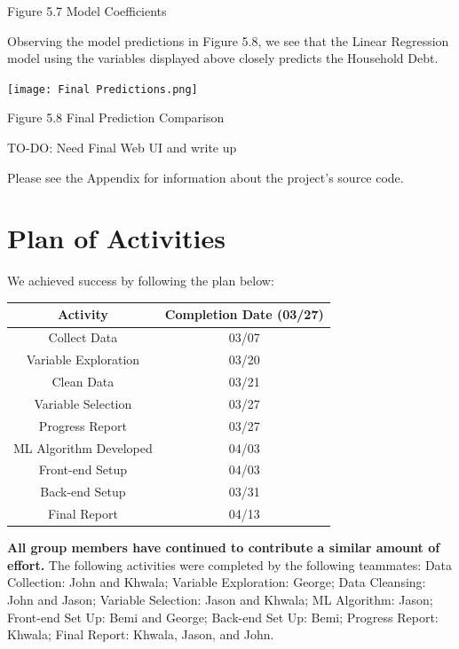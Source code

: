 \documentclass[sigconf,nonacm,11pt]{acmart}
\begin{document}
\begin{center} Figure 5.7 Model Coefficients \end{center}


Observing the model predictions in Figure 5.8, we see that the Linear Regression model using the variables displayed above closely predicts the Household Debt.

\texttt{[image: Final Predictions.png]}
\begin{center}Figure 5.8 Final Prediction Comparison \end{center}

TO-DO: Need Final Web UI and write up

Please see the Appendix for information about the project's source code.

\section{Plan of Activities}

We achieved success by following the plan below:\vspace{0.07em}
\begin{center}
    \begin{tabular}{||c|c||}
    \hline
    Activity & Completion Date (03/27)\\
    \hline\hline
    Collect Data & 03/07\\
    Variable Exploration & 03/20\\
    Clean Data & 03/21\\
    Variable Selection & 03/27\\
    Progress Report & 03/27\\
    ML Algorithm Developed & 04/03\\
    Front-end Setup & 04/03\\
    Back-end Setup & 03/31\\
    Final Report & 04/13\\
    \hline
    \end{tabular}
\end{center}

\textbf{All group members have continued to contribute a similar amount of effort.} The following activities were completed by the following teammates: Data Collection: John and Khwala; Variable Exploration: George; Data Cleansing: John and Jason; Variable Selection: Jason and Khwala; ML Algorithm: Jason; Front-end Set Up: Bemi and George; Back-end Set Up: Bemi; Progress Report: Khwala; Final Report: Khwala, Jason, and John. 
\end{document}
